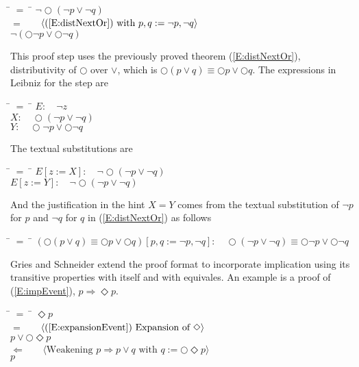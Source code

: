 \documentclass[fleqn, leqno]{article}
\newcommand{\lgap}{2pt}                             %
\newcommand{\mymathindent}{24pt}                    %
\newcommand{\impl}{\ensuremath{\Rightarrow}}        %
\newcommand{\Next}{\bigcirc}
\newcommand{\Event}{\Diamond}
\newcommand{\Gll} {\langle}                         %
\newcommand{\Ggg} {\rangle}                         %
\newcommand{\Hint}[1]     {\ \ \ $\Gll              \mbox{#1} \Ggg$ }   %
\begin{document}
\begin{tabbing}
\hspace{\mymathindent} \= $= \;$ \= \kill
  \> \>   $\lnot\Next (\lnot p \lor \lnot q)$\\[\lgap]
  \> $=$  \>  \Hint{(\ref{E:distNextOr}) with $p,q := \lnot p, \lnot q$}\\[\lgap]
  \> \>   $\lnot (\Next\lnot p \lor \Next \lnot q)$
\end{tabbing}

This proof step uses the previously proved theorem (\ref{E:distNextOr}), distributivity of $\Next$ over $\lor$,
which is $\Next (p \lor q) \equiv \Next p \lor \Next q$.
The expressions in Leibniz for the step are

\begin{tabbing}
\hspace{\mymathindent} \= $= \;$ \= \kill
  \> $E:\quad \lnot z$\\[\lgap]
  \> $X:\quad \Next (\lnot p \lor \lnot q)$\\[\lgap]
  \> $Y:\quad \Next \lnot p \lor \Next \lnot q$
\end{tabbing}

The textual substitutions are

\begin{tabbing}
\hspace{\mymathindent} \= $= \;$ \= \kill
  \> $E[z:=X]:\quad \lnot\Next (\lnot p \lor \lnot q)$\\[\lgap]
  \> $E[z:=Y]:\quad \lnot\Next (\lnot p \lor \lnot q)$
\end{tabbing}

And the justification in the hint $X=Y$ comes from the textual substitution of $\lnot p$ for $p$
and $\lnot q$ for $q$ in (\ref{E:distNextOr}) as follows

\begin{tabbing}
\hspace{\mymathindent} \= $= \;$ \= \kill
  \> $(\Next (p \lor q) \equiv \Next p \lor \Next q)[p,q:=\lnot p, \lnot q]:\quad
      \Next (\lnot p \lor \lnot q) \equiv \Next \lnot p \lor \Next \lnot q$
\end{tabbing}

Gries and Schneider \cite{LADM} extend the proof format to incorporate implication using its transitive properties
with itself and with equivales.
An example is a proof of (\ref{E:impEvent}), $p \Rightarrow \Event p$.

\begin{tabbing}
\hspace{\mymathindent} \= $= \;$ \= \kill
  \> \>   $\Event p$\\[\lgap]
  \> $=$  \>  \Hint{(\ref{E:expansionEvent}) Expansion of $\Event$}\\[\lgap]
  \> \>   $p \lor \Next\Event p$\\[\lgap]
  \> $\Leftarrow$  \>  \Hint{Weakening $p\impl p\lor q$ with $q:=\Next\Event p$}\\[\lgap]
  \> \>   $p$
\end{tabbing}
\end{document}
